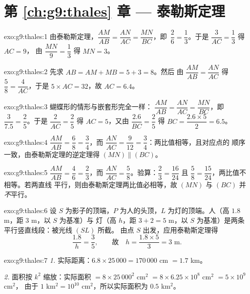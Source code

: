 \section*{第 \ref{ch:g9:thales} 章 --- 泰勒斯定理}

\begin{solution}{exo:g9:thales:1}
由泰勒斯定理，$\dfrac{AM}{AB} = \dfrac{AN}{AC} = \dfrac{MN}{BC}$，即\
$\dfrac26 = \dfrac13$。于是 $\dfrac{3}{AC} = \dfrac13$ 得 $AC = 9$，
由 $\dfrac{MN}{9} = \dfrac13$ 得 $MN = 3$。
\end{solution}

\begin{solution}{exo:g9:thales:2}
先求 $AB = AM + MB = 5 + 3 = 8$。然后
由 $\dfrac{AM}{AB} = \dfrac{AN}{AC}$ 得 $\dfrac58 = \dfrac{4}{AC}$，于是
$5 \times AC = 32$，故 $AC = 6.4$。
\end{solution}

\begin{solution}{exo:g9:thales:3}
蝴蝶形的情形与嵌套形完全一样：
$\dfrac{AM}{AB} = \dfrac{AN}{AC} = \dfrac{MN}{BC}$，即\
$\dfrac{3}{7.5} = \dfrac25$。于是 $\dfrac{2}{AC} = \dfrac25$ 得
$AC = 5$，又由 $\dfrac{2.6}{BC} = \dfrac25$ 得
$BC = \dfrac{2.6 \times 5}{2} = 6.5$。
\end{solution}

\begin{solution}{exo:g9:thales:4}
$\dfrac{AM}{AB} = \dfrac68 = \dfrac34$，而
$\dfrac{AN}{AC} = \dfrac{9}{12} = \dfrac34$：两比值相等，且对应点的
顺序一致，由泰勒斯定理的逆定理得 $(MN) \parallel (BC)$。
\end{solution}

\begin{solution}{exo:g9:thales:5}
$\dfrac{AM}{AB} = \dfrac46 = \dfrac23$，而
$\dfrac{AN}{AC} = \dfrac58$。验算：$\dfrac23 = \dfrac{16}{24}$
且 $\dfrac58 = \dfrac{15}{24}$，两比值不相等。若两直线
平行，则由泰勒斯定理两比值必相等，故 $(MN)$
与 $(BC)$ 并\emph{不}平行。
\end{solution}

\begin{solution}{exo:g9:thales:6}
设 $S$ 为影子的顶端，$P$ 为人的头顶，$L$
为灯的顶端。人（高 $1.8$ m，距 $3$ m，以 $S$ 为基准）与
灯（高 $h$，距 $3 + 2 = 5$ m，以 $S$ 为基准）是两条
平行竖直线段：被光线 $(SL)$ 所截。
由点 $S$ 出发，应用泰勒斯定理得
\[
\frac{1.8}{h} = \frac{3}{5},
\qquad\text{故}\quad
h = \frac{1.8 \times 5}{3} = 3 \text{ m}.
\]
\end{solution}

\begin{solution}{exo:g9:thales:7}
\emph{1.} 实际距离：$6.8 \times 25\,000 = 170\,000$ cm $=
1.7$ km。

\emph{2.} 面积按 $k^2$ 缩放：实际面积 $= 8 \times 25\,000^2$
cm$^2$ $= 8 \times 6.25 \times 10^8$ cm$^2$ $= 5 \times 10^9$ cm$^2$，
由于 $1$ km$^2 = 10^{10}$ cm$^2$，所以实际面积为 $0.5$ km$^2$。
\end{solution}

